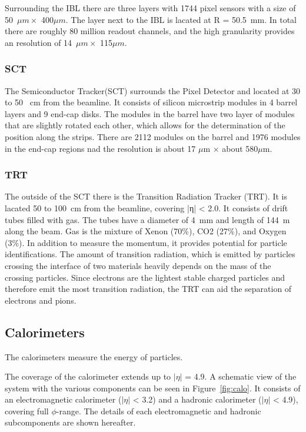 Surrounding the IBL there are three layers with 1744 pixel sensors with a size of 50~$\mu m \times$ 400$\mu m$. The layer next to the IBL is lacated at R = 50.5~mm. In total there are roughly 80 million readout channels, and the high granularity provides an resolution of 14~$\mu m \times$ 115$\mu m$.

\subsubsection{SCT}
The Semiconductor Tracker(SCT) surrounds the Pixel Detector and located at 30 to 50 ~cm from the beamline. 
It consists of silicon microstrip modules in 4 barrel layers and 9 end-cap disks.
The modules in the barrel have two layer of modules that are slightly rotated each other, which allows for the determination of the position along the strips. There are 2112 modules on the barrel and 1976 modules in the end-cap regions nad the resolution is about 17 $\mu$m $\times$ about 580$\mu$m.

\subsubsection{TRT}
The outside of the SCT there is the Transition Radiation Tracker (TRT). It is lacated 50 to 100~cm from the beamline, covering |η| < 2.0.
It consists of drift tubes filled with gas. The tubes have a diameter of 4~mm and length of 144~m along the beam. Gas is the  mixture of Xenon (70\%), CO2 (27\%), and Oxygen (3\%). 
In addition to measure the momentum, it provides potential for particle identifications. 
The amount of transition radiation, which is emitted by particles crossing the interface of two materials heavily depends on the mass of the crossing particles. Since electrons are the lightest stable charged particles and therefore emit the most transition radiation, the TRT can aid the separation of electrons and pions.

\subsection{Calorimeters}
The calorimeters measure the energy of particles. 

The coverage of the calorimeter extends up to $|\eta|$ = 4.9. A schematic view of the system with the various components can be seen in Figure~\ref{fig:calo}.
It consists of an electromagnetic calorimeter ($|\eta|$ < 3.2) and a hadronic calorimeter ($|\eta|$ < 4.9), covering full $\phi$-range. The details of each electromagnetic and hadronic subcomponents are shown hereafter.

